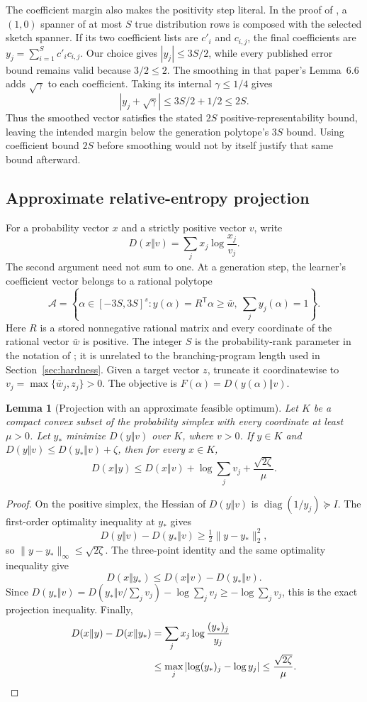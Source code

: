 \documentclass[11pt]{article}
\newtheorem{lemma}[theorem]{Lemma}
\theoremstyle{definition}
\theoremstyle{remark}
\begin{document}
The coefficient margin also makes the positivity step literal. In the proof of \citet[Lemma~6.3]{liu-moitra}, a $(1,0)$ spanner of at most $S$ true distribution rows is composed with the selected sketch spanner. If its two coefficient lists are $c'_i$ and $c_{i,j}$, the final coefficients are $y_j=\sum_{i=1}^S c'_ic_{i,j}$. Our choice gives $|y_j|\le3S/2$, while every published error bound remains valid because $3/2\le2$. The smoothing in that paper's Lemma~6.6 adds $\sqrt\gamma$ to each coefficient. Taking its internal $\gamma\le1/4$ gives
\[
|y_j+\sqrt\gamma|\le3S/2+1/2\le2S.
\]
Thus the smoothed vector satisfies the stated $2S$ positive-representability bound, leaving the intended margin below the generation polytope's $3S$ bound. Using coefficient bound $2S$ before smoothing would not by itself justify that same bound afterward.

\subsection{Approximate relative-entropy projection}

For a probability vector $x$ and a strictly positive vector $v$, write
\[
D(x\Vert v)=\sum_jx_j\log\frac{x_j}{v_j}.
\]
The second argument need not sum to one. At a generation step, the learner's coefficient vector belongs to a rational polytope
\[
\mathcal A=\left\{\alpha\in[-3S,3S]^s:
 y(\alpha)=R^{\mathsf T}\alpha\ge\bar w,\
 \sum_jy_j(\alpha)=1\right\}.
\]
Here $R$ is a stored nonnegative rational matrix and every coordinate of the rational vector $\bar w$ is positive. The integer $S$ is the probability-rank parameter in the notation of \citet{liu-moitra}; it is unrelated to the branching-program length used in Section~\ref{sec:hardness}. Given a target vector $z$, truncate it coordinatewise to $v_j=\max\{\bar w_j,z_j\}>0$. The objective is $F(\alpha)=D(y(\alpha)\Vert v)$.

\begin{lemma}[Projection with an approximate feasible optimum]\label{lem:approx-projection}
Let $K$ be a compact convex subset of the probability simplex with every coordinate at least $\mu>0$. Let $y_*$ minimize $D(y\Vert v)$ over $K$, where $v>0$. If $y\in K$ and
$D(y\Vert v)\le D(y_*\Vert v)+\zeta$, then for every $x\in K$,
\[
D(x\Vert y)\le D(x\Vert v)+\log\sum_jv_j+
\frac{\sqrt{2\zeta}}{\mu}.
\]
\end{lemma}
\begin{proof}
On the positive simplex, the Hessian of $D(y\Vert v)$ is
$\operatorname{diag}(1/y_j)\succeq I$. The first-order optimality inequality at $y_*$ gives
\[
D(y\Vert v)-D(y_*\Vert v)\ge\tfrac12\|y-y_*\|_2^2,
\]
so $\|y-y_*\|_\infty\le\sqrt{2\zeta}$. The three-point identity and the same optimality inequality give
\[
D(x\Vert y_*)\le D(x\Vert v)-D(y_*\Vert v).
\]
Since
$D(y_*\Vert v)=D(y_*\Vert v/\sum_jv_j)-\log\sum_jv_j
\ge-\log\sum_jv_j$, this is the exact projection inequality. Finally,
\begin{align*}
D(x\Vert y)-D(x\Vert y_*)
&=\sum_jx_j\log\frac{(y_*)_j}{y_j}\\
&\le\max_j\left|\log(y_*)_j-\log y_j\right|
\le\frac{\sqrt{2\zeta}}{\mu}.\qedhere
\end{align*}
\end{proof}
\end{document}
